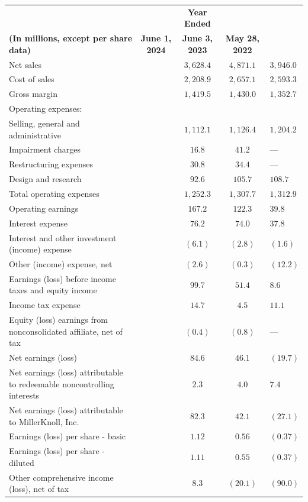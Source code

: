 \begin{tabular}{|l|c|c|c|}
\hline
&& \textbf{Year Ended}&\\
\textbf{(In millions, except per share data)} & \textbf{June 1, 2024} & \textbf{June 3, 2023} & \textbf{May 28, 2022} \\
\hline
Net sales & & $3,628.4$ & $4,871.1$ & $3,946.0$ \\
Cost of sales & & $2,208.9$ & $2,657.1$ & $2,593.3$ \\
Gross margin & & $1,419.5$ & $1,430.0$ & $1,352.7$ \\
\hline
Operating expenses: & & & & \\
Selling, general and administrative & & $1,112.1$ & $1,126.4$ & $1,204.2$ \\
Impairment charges & & $16.8$ & $41.2$ & — \\
Restructuring expenses & & $30.8$ & $34.4$ & — \\
Design and research & & $92.6$ & $105.7$ & $108.7$ \\
Total operating expenses & & $1,252.3$ & $1,307.7$ & $1,312.9$ \\
\hline
Operating earnings & & $167.2$ & $122.3$ & $39.8$ \\
Interest expense & & $76.2$ & $74.0$ & $37.8$ \\
Interest and other investment (income) expense & & $(6.1)$ & $(2.8)$ & $(1.6)$ \\
Other (income) expense, net & & $(2.6)$ & $(0.3)$ & $(12.2)$ \\
Earnings (loss) before income taxes and equity income & & $99.7$ & $51.4$ & $8.6$ \\
Income tax expense & & $14.7$ & $4.5$ & $11.1$ \\
Equity (loss) earnings from nonconsolidated affiliate, net of tax & & $(0.4)$ & $(0.8)$ & — \\
Net earnings (loss) & & $84.6$ & $46.1$ & $(19.7)$ \\
Net earnings (loss) attributable to redeemable noncontrolling interests & & $2.3$ & $4.0$ & $7.4$ \\
\hline
Net earnings (loss) attributable to MillerKnoll, Inc. & & $82.3$ & $42.1$ & $(27.1)$ \\
\hline
Earnings (loss) per share - basic & & $1.12$ & $0.56$ & $(0.37)$ \\
Earnings (loss) per share - diluted & & $1.11$ & $0.55$ & $(0.37)$ \\
\hline
Other comprehensive income (loss), net of tax & & $8.3$ & $(20.1)$ & $(90.0)$ \\

\end{tabular}
